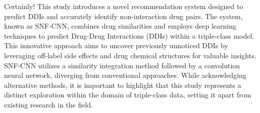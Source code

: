 \documentclass[unnumsec,webpdf,contemporary,large]{oup-authoring-template}%
\theoremstyle{thmstyleone}%
\theoremstyle{thmstyletwo}%
\theoremstyle{thmstylethree}%
\begin{document}
Certainly! This study introduces a novel recommendation system designed to predict DDIs and accurately identify non-interaction drug pairs. The system, known as SNF-CNN, combines drug similarities and employs deep learning techniques to predict Drug-Drug Interactions (DDIs) within a triple-class model. This innovative approach aims to uncover previously unnoticed DDIs by leveraging off-label side effects and drug chemical structures for valuable insights. SNF-CNN utilizes a similarity integration method followed by a convolution neural network, diverging from conventional approaches. While acknowledging alternative methods, it is important to highlight that this study represents a distinct exploration within the domain of triple-class data, setting it apart from existing research in the field.
\end{document}
